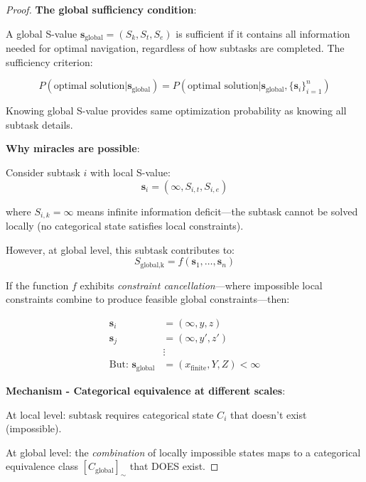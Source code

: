 \documentclass[12pt,a4paper]{article}
\begin{document}
\begin{proof}
\textbf{The global sufficiency condition}:

A global S-value $\mathbf{s}_{\text{global}} = (S_k, S_t, S_e)$ is sufficient if it contains all information needed for optimal navigation, regardless of how subtasks are completed. The sufficiency criterion:

\begin{equation}
P(\text{optimal solution} | \mathbf{s}_{\text{global}}) = P(\text{optimal solution} | \mathbf{s}_{\text{global}}, \{\mathbf{s}_i\}_{i=1}^n)
\end{equation}

Knowing global S-value provides same optimization probability as knowing all subtask details.

\textbf{Why miracles are possible}:

Consider subtask $i$ with local S-value:
\begin{equation}
\mathbf{s}_i = (\infty, S_{i,t}, S_{i,e})
\end{equation}

where $S_{i,k} = \infty$ means infinite information deficit—the subtask cannot be solved locally (no categorical state satisfies local constraints).

However, at global level, this subtask contributes to:
\begin{equation}
S_{\text{global,k}} = f(\mathbf{s}_1, \ldots, \mathbf{s}_n)
\end{equation}

If the function $f$ exhibits \textit{constraint cancellation}—where impossible local constraints combine to produce feasible global constraints—then:

\begin{align}
\mathbf{s}_i &= (\infty, y, z) \\
\mathbf{s}_j &= (\infty, y', z') \\
&\vdots \\
\text{But: } \mathbf{s}_{\text{global}} &= (x_{\text{finite}}, Y, Z) < \infty
\end{align}

\textbf{Mechanism - Categorical equivalence at different scales}:

At local level: subtask requires categorical state $C_i$ that doesn't exist (impossible).

At global level: the \textit{combination} of locally impossible states maps to a categorical equivalence class $[C_{\text{global}}]_{\sim}$ that DOES exist.


\end{proof}
\end{document}
